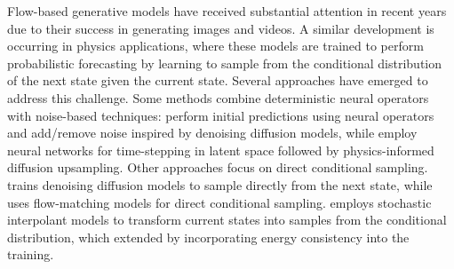 
Flow-based generative models have received substantial attention in recent years due to their success in generating images and videos. A similar development is occurring in physics applications, where these models are trained to perform probabilistic forecasting by learning to sample from the conditional distribution of the next state given the current state. Several approaches have emerged to address this challenge. Some methods combine deterministic neural operators with noise-based techniques: \cite{lippe_pde-refiner_2023} perform initial predictions using neural operators and add/remove noise inspired by denoising diffusion models, while \cite{gao_generative_2024} employ neural networks for time-stepping in latent space followed by physics-informed diffusion upsampling. Other approaches focus on direct conditional sampling. \cite{kohl_benchmarking_2024} trains denoising diffusion models to sample directly from the next state, while \cite{fotiadis_stochastic_2024} uses flow-matching models for direct conditional sampling. \cite{chen_probabilistic_2024} employs stochastic interpolant models to transform current states into samples from the conditional distribution, which \cite{mucke_physics-aware_2025} extended by incorporating energy consistency into the training.

